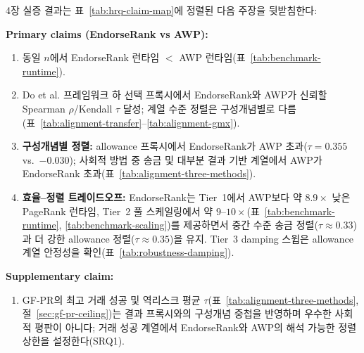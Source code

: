 
4장 실증 결과는 표~\ref{tab:hrq-claim-map}에 정렬된 다음 주장을 뒷받침한다:

\textbf{Primary claims (EndorseRank vs AWP):}

\begin{enumerate}
\item[\textbf{C1.}] 동일 $n$에서 EndorseRank 런타임 $<$ AWP 런타임(표~\ref{tab:benchmark-runtime}).
\item[\textbf{C2.}] Do et al. 프레임워크 하 선택 프록시에서 EndorseRank와 AWP가 신뢰할 Spearman $\rho$/Kendall $\tau$ 달성; 계열 수준 정렬은 구성개념별로 다름(표~\ref{tab:alignment-transfer}--\ref{tab:alignment-gmx}).
\item[\textbf{C3.}] \textbf{구성개념별 정렬:} allowance 프록시에서 EndorseRank가 AWP 초과($\tau=0.355$ vs.\ $-0.030$); 사회적 방법 중 송금 및 대부분 결과 기반 계열에서 AWP가 EndorseRank 초과(표~\ref{tab:alignment-three-methods}).
\item[\textbf{C4.}] \textbf{효율--정렬 트레이드오프:} EndorseRank는 Tier~1에서 AWP보다 약 $8.9\times$ 낮은 PageRank 런타임, Tier~2 풀 스케일링에서 약 $9$--$10\times$(표~\ref{tab:benchmark-runtime}, \ref{tab:benchmark-scaling})를 제공하면서 중간 수준 송금 정렬($\tau \approx 0.33$)과 더 강한 allowance 정렬($\tau \approx 0.35$)을 유지. Tier~3 damping 스윕은 allowance 계열 안정성을 확인(표~\ref{tab:robustness-damping}).
\end{enumerate}

\textbf{Supplementary claim:}

\begin{enumerate}
\item[\textbf{SC1.}] GF-PR의 최고 거래 성공 및 역리스크 평균 $\tau$(표~\ref{tab:alignment-three-methods}, 절~\ref{sec:gf-pr-ceiling})는 결과 프록시와의 구성개념 중첩을 반영하며 우수한 사회적 평판이 아니다; 거래 성공 계열에서 EndorseRank와 AWP의 해석 가능한 정렬 상한을 설정한다(SRQ1).
\end{enumerate}
